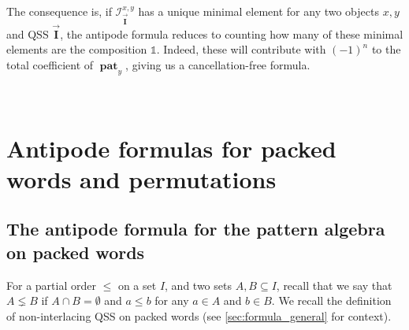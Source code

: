 \documentclass[12pt, reqno]{amsart}
\theoremstyle{definition}
\newcommand{\III}{\vec{\mathbf{I}}}
\DeclareMathOperator{\pat}{\mathbf{pat}}
\begin{document}



\

The consequence is, if $\mathcal I_{\III}^{x, y}$ has a unique minimal element for any two objects $x, y$ and QSS $\III$, the antipode formula reduces to counting how many of these minimal elements are the composition $\mathbb{1}$.
Indeed, these will contribute with $(-1)^n$ to the total coefficient of $\pat_y$, giving us a cancellation-free formula.

\


\section{Antipode formulas for packed words and permutations\label{sec:formula_pp}}
\subsection{The antipode formula for the pattern algebra on packed words\label{sec:formula_packed}}
For a partial order $\leq$ on a set $I$, and two sets $A, B \subseteq I$, recall that we say that $A \lneq B$ if $A\cap B = \emptyset$ and $a \leq b$ for any $a \in A$ and $b \in B$.
We recall the definition of non-interlacing QSS on packed words (see \cref{sec:formula_general} for context).
\end{document}
